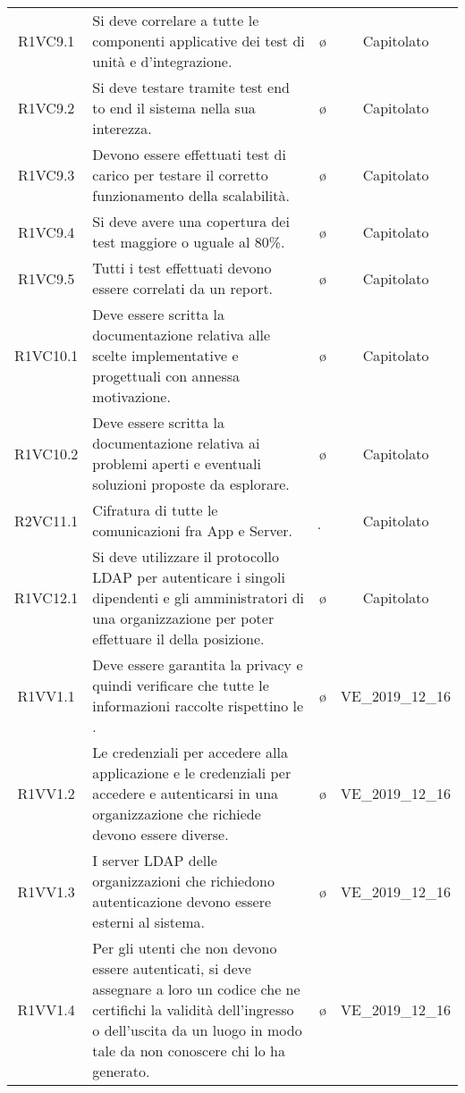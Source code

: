 {\begin{longtable}{ c C{6.5cm} c c}
R1VC9.1 & Si deve correlare a tutte le componenti applicative dei test di unità e d’integrazione. & \o & Capitolato \\
R1VC9.2 & Si deve testare tramite test end to end il sistema nella sua interezza. & \o & Capitolato \\
R1VC9.3 & Devono essere effettuati test di carico per testare il corretto funzionamento della scalabilità. & \o & Capitolato \\
R1VC9.4 & Si deve avere una copertura dei test maggiore o uguale al 80\%. & \o & Capitolato \\
R1VC9.5 & Tutti i test effettuati devono essere correlati da un report. & \o & Capitolato \\
R1VC10.1 & Deve essere scritta la documentazione relativa alle scelte implementative e progettuali con annessa motivazione. & \o & Capitolato \\
R1VC10.2 & Deve essere scritta la documentazione relativa ai problemi aperti e eventuali soluzioni proposte da esplorare. & \o & Capitolato \\
R2VC11.1 & Cifratura di tutte le comunicazioni fra App e Server. & \d & Capitolato  \\
R1VC12.1 & Si deve utilizzare il protocollo LDAP per autenticare i singoli dipendenti e gli amministratori di una organizzazione per poter effettuare il  della posizione. & \o & Capitolato \\	
R1VV1.1 & Deve essere garantita la privacy e quindi verificare che tutte le informazioni raccolte rispettino le . & \o & VE\_2019\_12\_16 \\
R1VV1.2 & Le credenziali per accedere alla applicazione e le credenziali per accedere e autenticarsi in una organizzazione che richiede  devono essere diverse. & \o & VE\_2019\_12\_16 \\
R1VV1.3 & I server LDAP delle organizzazioni che richiedono autenticazione devono essere esterni al sistema.  & \o & VE\_2019\_12\_16 \\
R1VV1.4 & Per gli utenti che non devono essere autenticati, si deve assegnare a loro un codice che ne certifichi la validità dell’ingresso o dell'uscita da un luogo in modo tale da non conoscere chi lo ha generato. & \o & VE\_2019\_12\_16 \\
\end{longtable}
}